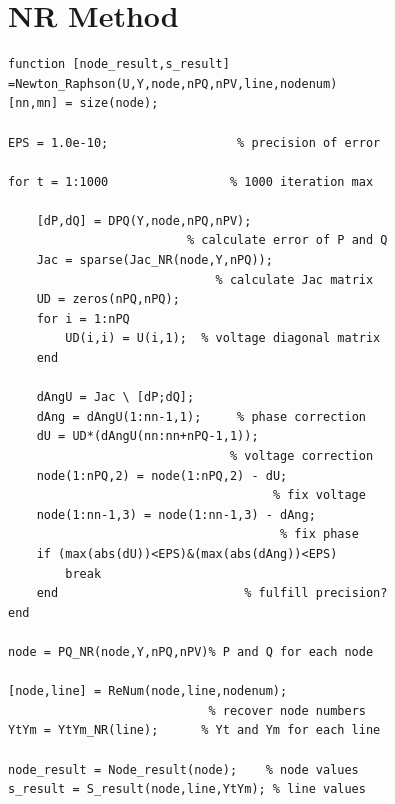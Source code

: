 \documentclass[conference]{IEEEtran}
\begin{document}
\section{NR Method}
\begin{lstlisting}
function [node_result,s_result] =Newton_Raphson(U,Y,node,nPQ,nPV,line,nodenum)
[nn,mn] = size(node);

EPS = 1.0e-10;                  % precision of error

for t = 1:1000                 % 1000 iteration max

    [dP,dQ] = DPQ(Y,node,nPQ,nPV);                    
                         % calculate error of P and Q
    Jac = sparse(Jac_NR(node,Y,nPQ));
                             % calculate Jac matrix
    UD = zeros(nPQ,nPQ); 
    for i = 1:nPQ
        UD(i,i) = U(i,1);  % voltage diagonal matrix
    end

    dAngU = Jac \ [dP;dQ];
    dAng = dAngU(1:nn-1,1);     % phase correction
    dU = UD*(dAngU(nn:nn+nPQ-1,1));
                               % voltage correction
    node(1:nPQ,2) = node(1:nPQ,2) - dU;
                                     % fix voltage
    node(1:nn-1,3) = node(1:nn-1,3) - dAng;
                                      % fix phase
    if (max(abs(dU))<EPS)&(max(abs(dAng))<EPS)
        break
    end                          % fulfill precision?
end

node = PQ_NR(node,Y,nPQ,nPV)% P and Q for each node

[node,line] = ReNum(node,line,nodenum);
                            % recover node numbers
YtYm = YtYm_NR(line);      % Yt and Ym for each line

node_result = Node_result(node);    % node values
s_result = S_result(node,line,YtYm); % line values
\end{lstlisting}
\end{document}
